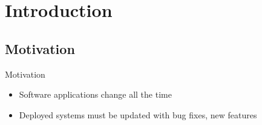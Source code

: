 

{
\section{Introduction}
\subsection{Motivation}
\begin{frame}{Motivation}%
\begin{itemize}
\item Software applications change all the time
\item Deployed systems must be updated with bug fixes, new features
\end{itemize}
\vspace{1ex}
\end{frame}
}

